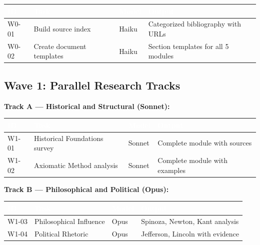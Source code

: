 \documentclass[11pt,letterpaper]{article}
\newcommand{\tableheader}[1]{\textbf{\sffamily\textcolor{white}{#1}}}
\begin{document}
\begin{center}
\begin{tabularx}{\textwidth}{C{1.2cm}L{3.5cm}C{1.5cm}X}
\toprule
{}
\tableheader{ID} & \tableheader{Task} & \tableheader{Model} & \tableheader{Output} \\
\midrule
W0-01 & Build source index & Haiku & Categorized bibliography with URLs \\
W0-02 & Create document templates & Haiku & Section templates for all 5 modules \\
\bottomrule
\end{tabularx}
\end{center}

\subsection{Wave 1: Parallel Research Tracks}

\textbf{Track A --- Historical and Structural (Sonnet):}

\begin{center}
\begin{tabularx}{\textwidth}{C{1.2cm}L{3.5cm}C{1.5cm}X}
\toprule
{}
\tableheader{ID} & \tableheader{Task} & \tableheader{Model} & \tableheader{Output} \\
\midrule
W1-01 & Historical Foundations survey & Sonnet & Complete module with sources \\
W1-02 & Axiomatic Method analysis & Sonnet & Complete module with examples \\
\bottomrule
\end{tabularx}
\end{center}

\textbf{Track B --- Philosophical and Political (Opus):}

\begin{center}
\begin{tabularx}{\textwidth}{C{1.2cm}L{3.5cm}C{1.5cm}X}
\toprule
{}
\tableheader{ID} & \tableheader{Task} & \tableheader{Model} & \tableheader{Output} \\
\midrule
W1-03 & Philosophical Influence & Opus & Spinoza, Newton, Kant analysis \\
W1-04 & Political Rhetoric & Opus & Jefferson, Lincoln with evidence \\
\bottomrule
\end{tabularx}
\end{center}
\end{document}
